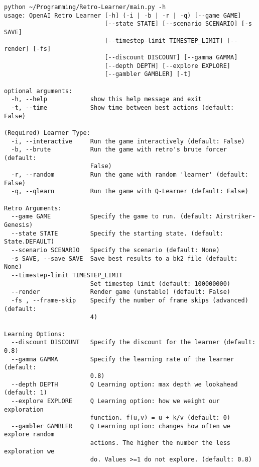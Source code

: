 \begin{minipage}{7.5in}
\begin{lstlisting}[basicstyle=\footnotesize]
python ~/Programming/Retro-Learner/main.py -h
usage: OpenAI Retro Learner [-h] (-i | -b | -r | -q) [--game GAME]
                            [--state STATE] [--scenario SCENARIO] [-s SAVE]
                            [--timestep-limit TIMESTEP_LIMIT] [--render] [-fs]
                            [--discount DISCOUNT] [--gamma GAMMA]
                            [--depth DEPTH] [--explore EXPLORE]
                            [--gambler GAMBLER] [-t]

optional arguments:
  -h, --help            show this help message and exit
  -t, --time            Show time between best actions (default: False)

(Required) Learner Type:
  -i, --interactive     Run the game interactively (default: False)
  -b, --brute           Run the game with retro's brute forcer (default:
                        False)
  -r, --random          Run the game with random 'learner' (default: False)
  -q, --qlearn          Run the game with Q-Learner (default: False)

Retro Arguments:
  --game GAME           Specify the game to run. (default: Airstriker-Genesis)
  --state STATE         Specify the starting state. (default: State.DEFAULT)
  --scenario SCENARIO   Specify the scenario (default: None)
  -s SAVE, --save SAVE  Save best results to a bk2 file (default: None)
  --timestep-limit TIMESTEP_LIMIT
                        Set timestep limit (default: 100000000)
  --render              Render game (unstable) (default: False)
  -fs , --frame-skip    Specify the number of frame skips (advanced) (default:
                        4)

Learning Options:
  --discount DISCOUNT   Specify the discount for the learner (default: 0.8)
  --gamma GAMMA         Specify the learning rate of the learner (default:
                        0.8)
  --depth DEPTH         Q Learning option: max depth we lookahead (default: 1)
  --explore EXPLORE     Q Learning option: how we weight our exploration
                        function. f(u,v) = u + k/v (default: 0)
  --gambler GAMBLER     Q Learning option: changes how often we explore random
                        actions. The higher the number the less exploration we
                        do. Values >=1 do not explore. (default: 0.8)
\end{lstlisting}
\end{minipage}
